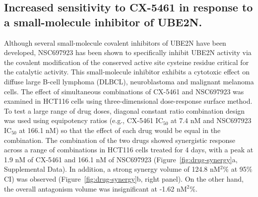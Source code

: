 \subsection{Increased sensitivity to CX-5461 in response to a small-molecule inhibitor of UBE2N.}
Although several small-molecule covalent inhibitors of UBE2N have been developed\cite{Tsukamoto2008,Ushiyama2012,Strickson2013}, NSC697923 has been shown to specifically inhibit UBE2N activity via the covalent modification of the conserved active site cysteine residue critical for the catalytic activity\cite{Hodge2015a}. This small-molecule inhibitor exhibits a cytotoxic effect on diffuse large B-cell lymphoma (DLBCL), neuroblastoma and malignant melanoma cells\cite{Pulvino2012,Cheng2014,Dikshit2018a}. The effect of simultaneous combinations of CX-5461 and NSC697923 was examined in HCT116 cells using three-dimensional dose-response surface method\cite{Prichard1990,Prichard1993}. To test a large range of drug doses, diagonal constant ratio combination design was used using equipotency ratios (e.g., CX-5461 IC$_{50}$ at 7.4 nM and NSC697923 IC$_{50}$ at 166.1 nM) so that the effect of each drug would be equal in the combination\cite{Chou2006}. The combination of the two drugs showed synergistic response across a range of combinations in HCT116 cells treated for 4 days, with a peak at 1.9 nM of CX-5461 and 166.1 nM of NSC697923 (Figure~\ref{fig:drug-synergy}a, Supplemental Data). In addition, a strong synergy volume of 124.8 nM$^2$\% at 95\% CI) was observed (Figure~\ref{fig:drug-synergy}b, right panel). On the other hand, the overall antagonism volume was insignificant at -1.62 nM$^2$\%.  